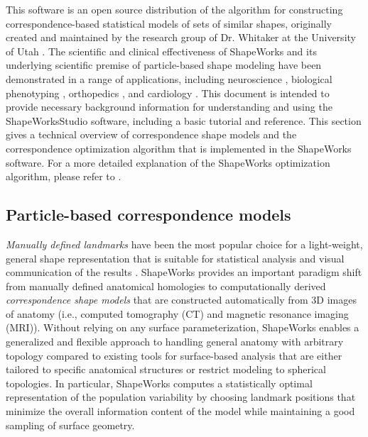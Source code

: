\documentclass[letterpaper,12pt]{article}   %
\begin{document}
This software is an open source distribution of the algorithm for constructing correspondence-based statistical models of sets of similar shapes, originally created and maintained by the research group of Dr. Whitaker at the University of Utah \cite{cates2006entropy,cates2007shape,cates2008particle,oguz2015entropy,cates2017shapeworks}.  The scientific and clinical effectiveness of ShapeWorks and its underlying scientific premise of particle-based shape modeling have been demonstrated in a range of applications, including neuroscience \cite{cates2008particle,oguz2008cortical,oguz2009cortical,datar2009particle,datar2013geodesic,sultana2016towards},
biological phenotyping \cite{cates2008shape,jones2013toward}, orthopedics \cite{jones2013toward,harris2013statistical,atkins2016quantitative}, and cardiology \cite{cates2015computational,gardner2013point}. This document is intended to provide necessary background information for understanding and using the ShapeWorksStudio software, including a basic tutorial and reference. This section gives a technical overview of correspondence shape models and the correspondence optimization algorithm that is implemented in the ShapeWorks software. For a more detailed explanation of the ShapeWorks optimization algorithm, please refer to \cite{cates2007shape,cates2017shapeworks}.

\subsection{Particle-based correspondence models} 


\textit{Manually defined landmarks} have been the most popular choice for a light-weight, general shape representation that is suitable for statistical analysis and visual communication of the results \cite{sarkalkan2014statistical,zachow2015computational}. ShapeWorks provides an important paradigm shift from manually defined anatomical homologies to computationally derived {\em correspondence shape models} that are constructed automatically from 3D images of anatomy (i.e., computed tomography (CT) and magnetic resonance imaging (MRI)). Without relying on any surface parameterization, ShapeWorks enables a generalized and flexible approach to handling general anatomy with arbitrary topology compared to existing tools for surface-based analysis that are either tailored to specific anatomical structures or restrict modeling to spherical topologies. In particular, ShapeWorks computes a statistically optimal representation of the population variability by choosing landmark positions that minimize the overall information content of the model while maintaining a good sampling of surface geometry. 
\end{document}
